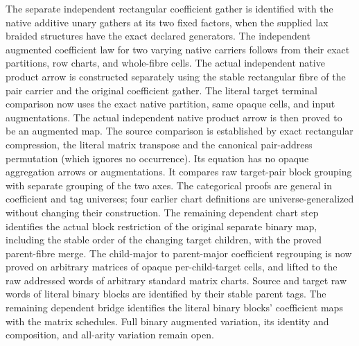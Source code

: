\documentclass{article}
\begin{document}
The separate independent rectangular coefficient gather is identified
with the native additive unary gathers at its two fixed factors, when
the supplied lax braided structures have the exact declared generators.
The independent augmented coefficient law for two varying native
carriers follows from their exact partitions, row charts, and whole-fibre
cells. The actual independent native product arrow is constructed
separately using the stable rectangular fibre of the pair carrier and
the original coefficient gather. The literal target terminal comparison now uses the exact native
partition, same opaque cells, and input augmentations. The actual independent native product arrow is then proved to be an
augmented map. The source comparison is established by exact
rectangular compression, the literal matrix transpose and the
canonical pair-address permutation (which ignores no occurrence).
Its equation has no opaque aggregation arrows or augmentations.
It compares raw target-pair block grouping with separate grouping of
the two axes. The categorical proofs are general in coefficient and
tag universes; four earlier chart definitions are universe-generalized
without changing their construction. The remaining dependent chart step
identifies the actual block restriction of the original separate
binary map, including the stable order of the changing target
children, with the proved parent-fibre merge. The child-major to parent-major coefficient regrouping is now proved
on arbitrary matrices of opaque per-child-target cells, and lifted to
the raw addressed words of arbitrary standard matrix charts. Source and target raw words of literal binary blocks are identified by
their stable parent tags. The remaining dependent bridge identifies the
literal binary blocks' coefficient maps with the matrix schedules. Full binary augmented
variation, its identity and composition, and all-arity variation
remain open.
\end{document}
